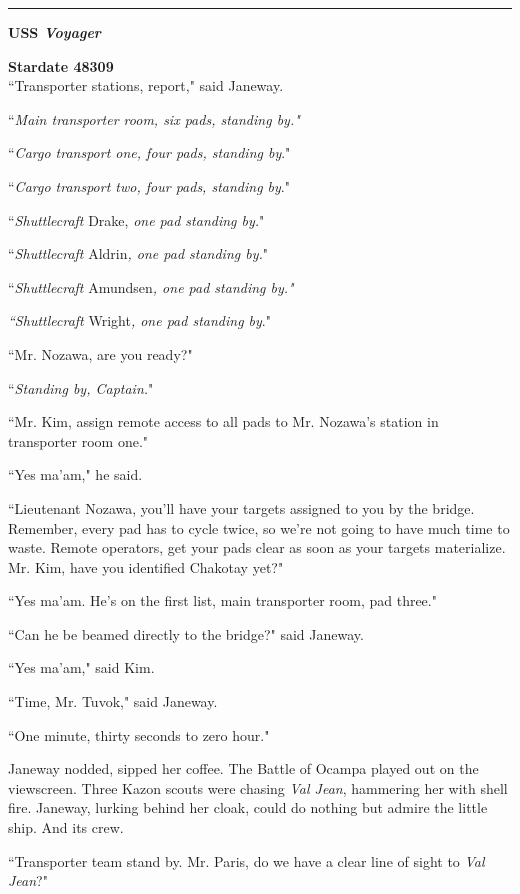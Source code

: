 \documentclass[twoside,letterpaper,12pt]{memoir}
\begin{document}
\begin{center}\rule{3cm}{0.4 pt}\end{center} 

\noindent\textbf{USS \textit{Voyager}} 

\noindent\textbf{Stardate 48309}\\

``Transporter stations, report," said Janeway. 

``\textit{Main transporter room, six pads, standing by."} 

``\textit{Cargo transport one, four pads, standing by}." 

``\textit{Cargo transport two, four pads, standing by}." 

``\textit{Shuttlecraft }Drake, \textit{one pad standing by.}" 

``\textit{Shuttlecraft }Aldrin\textit{, one pad standing by.}" 

``\textit{Shuttlecraft }Amundsen\textit{, one pad standing by."} 

\textit{``Shuttlecraft }Wright\textit{, one pad standing by}." 

``Mr. Nozawa, are you ready?" 

``\textit{Standing by, Captain.}" 

``Mr. Kim, assign remote access to all pads to Mr. Nozawa's station in transporter room one." 

``Yes ma'am," he said. 

``Lieutenant Nozawa, you'll have your targets assigned to you by the bridge. Remember, every pad has to cycle twice, so we're not going to have much time to waste. Remote operators, get your pads clear as soon as your targets materialize. Mr. Kim, have you identified Chakotay yet?" 

``Yes ma'am. He's on the first list, main transporter room, pad three." 

``Can he be beamed directly to the bridge?" said Janeway. 

``Yes ma'am," said Kim. 

``Time, Mr. Tuvok," said Janeway. 

``One minute, thirty seconds to zero hour." 

Janeway nodded, sipped her coffee. The Battle of Ocampa played out on the viewscreen. Three Kazon scouts were chasing \textit{Val Jean}, hammering her with shell fire. Janeway, lurking behind her cloak, could do nothing but admire the little ship. And its crew. 

``Transporter team stand by. Mr. Paris, do we have a clear line of sight to \textit{Val Jean}?" 
\end{document}
